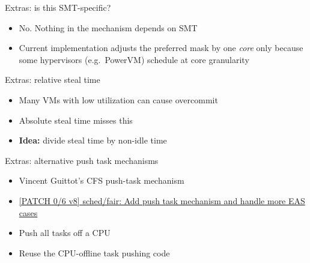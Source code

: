 \documentclass[xetex, table, 10pt,%
aspectratio=169%
]{beamer}
\begin{document}
\begin{frame}{Extras: is this SMT-specific?}
\begin{itemize}
  \item No. Nothing in the mechanism depends on SMT
  \item Current implementation adjusts the preferred mask by one
    \emph{core} only because some hypervisors (e.g.\ PowerVM) schedule
    at core granularity
\end{itemize}
\end{frame}

\begin{frame}{Extras: relative steal time}
\begin{itemize}
  \item Many VMs with low utilization can cause overcommit
  \item Absolute steal time misses this
  \item \textbf{Idea:} divide steal time by non-idle time
\end{itemize}
\end{frame}

\begin{frame}{Extras: alternative push task mechanisms}
\begin{itemize}
  \item Vincent Guittot's CFS push-task mechanism
  \item {\small\href{https://lore.kernel.org/all/20251202181242.1536213-1-vincent.guittot@linaro.org/}{[PATCH
    0/6 v8] sched/fair: Add push task mechanism and handle more EAS
    cases}}
  \item Push all tasks off a CPU
  \item Reuse the CPU-offline task pushing code
\end{itemize}
\end{frame}
\end{document}

